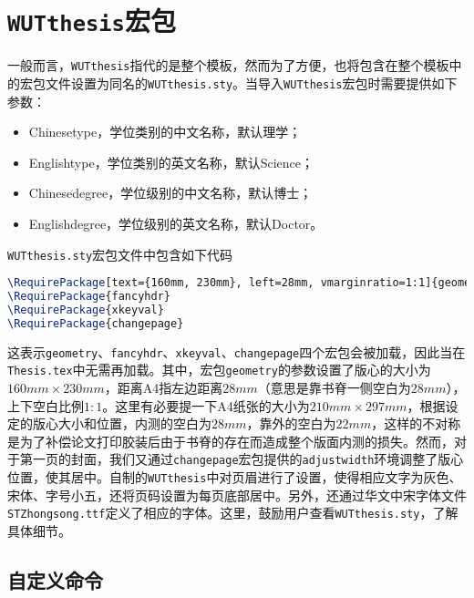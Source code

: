 \section{\texttt{WUTthesis}宏包}

\par 一般而言，\texttt{WUTthesis}指代的是整个模板，然而为了方便，也将包含在整个模板中的宏包文件设置为同名的\texttt{WUTthesis.sty}。当导入\texttt{WUTthesis}宏包时需要提供如下参数：
\begin{itemize}
\item Chinesetype，学位类别的中文名称，默认理学；
\item Englishtype，学位类别的英文名称，默认Science；
\item Chinesedegree，学位级别的中文名称，默认博士；
\item Englishdegree，学位级别的英文名称，默认Doctor。
\end{itemize}
\texttt{WUTthesis.sty}宏包文件中包含如下代码
\begin{lstlisting}[language=TeX]
\RequirePackage[text={160mm, 230mm}, left=28mm, vmarginratio=1:1]{geometry}
\RequirePackage{fancyhdr}
\RequirePackage{xkeyval}
\RequirePackage{changepage}
\end{lstlisting}
这表示\texttt{geometry}、\texttt{fancyhdr}、\texttt{xkeyval}、\texttt{changepage}四个宏包会被加载，因此当在\texttt{Thesis.tex}中无需再加载。其中，宏包\texttt{geometry}的参数设置了版心的大小为$160mm\times 230mm$，距离A4指左边距离$28mm$（意思是靠书脊一侧空白为$28mm$），上下空白比例$1:1$。这里有必要提一下A4纸张的大小为$210mm\times 297mm$，根据设定的版心大小和位置，内测的空白为$28mm$，靠外的空白为$22mm$，这样的不对称是为了补偿论文打印胶装后由于书脊的存在而造成整个版面内测的损失。然而，对于第一页的封面，我们又通过\texttt{changepage}宏包提供的\texttt{adjustwidth}环境调整了版心位置，使其居中。自制的\texttt{WUTthesis}中对页眉进行了设置，使得相应文字为灰色、宋体、字号小五，还将页码设置为每页底部居中。另外，还通过{\STZhongsong 华文中宋}字体文件\texttt{STZhongsong.ttf}定义了相应的字体。这里，鼓励用户查看\texttt{WUTthesis.sty}，了解具体细节。







\subsection{自定义命令}


